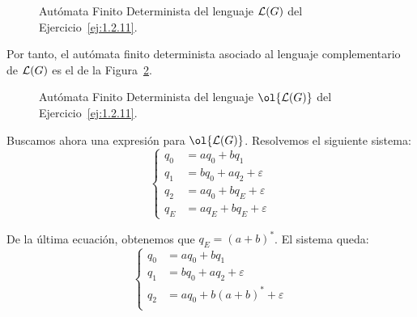 \begin{ejercicio}
\begin{figure}
\begin{tikzpicture}
        \end{tikzpicture}
        \caption{Autómata Finito Determinista del lenguaje $\cc{L}(G)$ del Ejercicio~\ref{ej:1.2.11}.}
        \label{fig:ej:1.2.11_L_exp}
    \end{figure}

    Por tanto, el autómata finito determinista asociado al lenguaje complementario de $\cc{L}(G)$ es el de la Figura~\ref{fig:ej:1.2.11_L_comp}.
    \begin{figure}
        \centering
        \caption{Autómata Finito Determinista del lenguaje $\ol{\cc{L}(G)}$ del Ejercicio~\ref{ej:1.2.11}.}
        \label{fig:ej:1.2.11_L_comp}
    \end{figure}

    Buscamos ahora una expresión para $\ol{\cc{L}(G)}$. Resolvemos el siguiente sistema:
    \begin{equation*}
        \begin{cases}
            q_0 &= aq_0 + bq_1\\
            q_1 &= bq_0 + aq_2 + \varepsilon\\
            q_2 &= aq_0 + bq_E + \varepsilon\\
            q_E &= aq_E + bq_E + \varepsilon
        \end{cases}
    \end{equation*}

    De la última ecuación, obtenemos que $q_E = (a+b)^*$. El sistema queda:
    \begin{equation*}
        \begin{cases}
            q_0 &= aq_0 + bq_1\\
            q_1 &= bq_0 + aq_2 + \varepsilon\\
            q_2 &= aq_0 + b(a+b)^* + \varepsilon\\
        \end{cases}
    \end{equation*}


\end{ejercicio}
